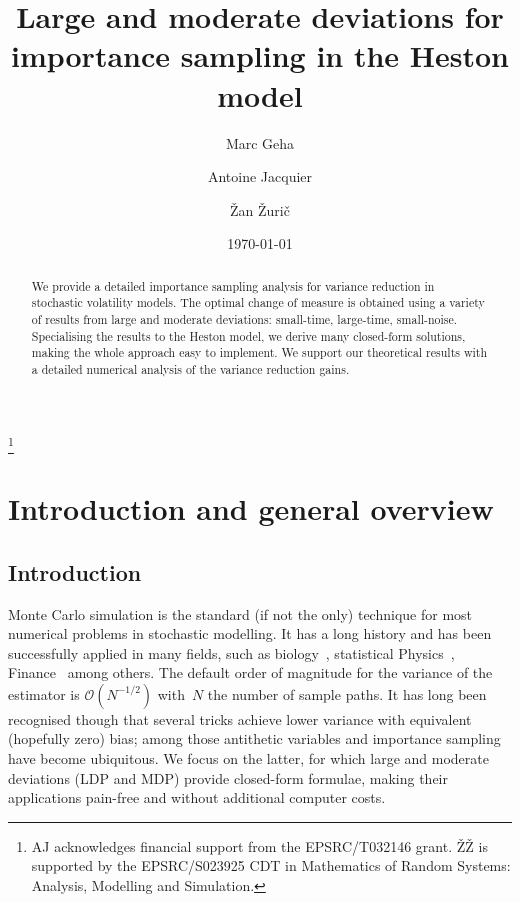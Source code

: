 \documentclass{amsart}[11pt]
\numberwithin{equation}{section}
\numberwithin{theorem}{subsection}
\numberwithin{proposition}{subsection}
\numberwithin{definition}{subsection}
\numberwithin{lemma}{subsection}
\numberwithin{assumption}{subsection}
\begin{document}
\title{Large and moderate deviations for importance sampling in the Heston model}
\author{Marc Geha}
\address{ORFE Department, Princeton University}
\author{Antoine Jacquier}
\address{Department of Mathematics, Imperial College London, and Alan Turing Institute}
\author{\v{Z}an \v{Z}uri\v{c}}
\address{Department of Mathematics, Imperial College London}
\thanks{AJ acknowledges financial support from the EPSRC/T032146 grant. \v{Z}\v{Z} is supported by the EPSRC/S023925 CDT in Mathematics of Random Systems: Analysis, Modelling and Simulation.}

\date{\today}
\maketitle

\begin{abstract}
We provide a detailed importance sampling analysis for variance reduction in stochastic volatility models.
The optimal change of measure is obtained using a variety of results from large and moderate deviations: small-time, large-time, small-noise.
Specialising the results to the Heston model, we derive many closed-form solutions, 
making the whole approach easy to implement.
We support our theoretical results with  a detailed numerical analysis of the variance reduction gains.
\end{abstract}

\tableofcontents

\section{Introduction and general overview}

\subsection{Introduction}
Monte Carlo simulation is the  standard (if not the only) technique for most numerical problems in stochastic modelling.
It has a long history and has been successfully applied in many fields, such as biology~\cite{manly2018randomization}, statistical Physics~\cite{binder2012monte}, Finance~\cite{glasserman2004monte} among others.
The default order of magnitude for the variance of the estimator is $\mathcal{O}(N^{-1/2})$ with~$N$ the number of sample paths.
It has long been recognised though that several tricks achieve lower variance with equivalent (hopefully zero) bias; among those antithetic variables and importance sampling have become ubiquitous.
We focus on the latter, for which large and moderate deviations (LDP and MDP) provide closed-form formulae, 
making their applications pain-free and without additional computer costs.
\end{document}
